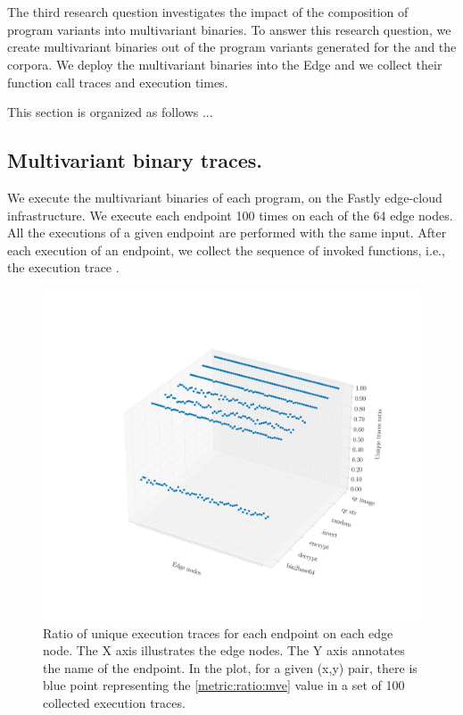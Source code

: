 \section{\rqthree}

The third research question investigates the impact of the composition of program variants into multivariant binaries.
To answer this research question, we create multivariant binaries out of the program variants generated for the \corpussodium and the \corpusqrcode corpora. We deploy the multivariant binaries into the Edge and we collect their function call traces and execution times.

This section is organized as follows ... 

\subsection*{Multivariant binary traces.}

We execute the multivariant binaries of each program, on the Fastly edge-cloud infrastructure. 
We execute each endpoint 100 times on each of the 64 edge nodes.
All the executions of a given endpoint are performed with the same input.
After each execution of an endpoint, we collect the sequence of invoked functions, i.e., the execution trace . 


\begin{figure}[h]
    \includegraphics[width=0.9\linewidth]{plots/rq3.3d.pdf}
    \caption{Ratio of unique execution traces for each endpoint on each edge node.   The X axis illustrates the edge nodes.
    The Y axis annotates the name of the endpoint.
    In the plot, for a given (x,y) pair, there is blue point representing the \autoref{metric:ratio:mve} value in a set of 100 collected execution traces.}
    \label{rq3:hashes:collision}
\end{figure}

